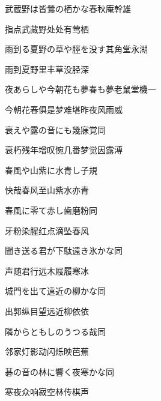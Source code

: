 \begin{haiku}
    {\FH 武蔵野は皆鶯の栖かな}\hfill{\FH 春秋庵幹雄}

    {\FK 指点武藏野处处有莺栖}
\end{haiku}

\begin{haiku}
    {\FH 雨到る夏野の草や脛を没す}\hfill{\FH 其角堂永湖}

    {\FK 雨到夏野里丰草没胫深}
\end{haiku}

\begin{haiku}
    {\FH 夜あらしや今朝花も夢春も夢}\hfill{\FH 老鼠堂機一}

    {\FK 今朝花春俱是梦难堪昨夜风雨威}
\end{haiku}

\begin{haiku}
    {\FH 衰えや露の音にも幾寐覚}\hfill{\FH 同}

    {\FK 衰朽残年增叹惋几番梦觉因露溥}
\end{haiku}

\begin{haiku}
    {\FH 春風や山紫に水青し}\hfill{\FH 子規}

    {\FK 快哉春风至山紫水亦青}
\end{haiku}

\begin{haiku}
    {\FH 春風に零て赤し歯磨粉}\hfill{\FH 同}

    {\FK 牙粉染腥红点滴坠春风}
\end{haiku}

\begin{haiku}
    {\FH 聞き送る君が下駄遠き氷かな}\hfill{\FH 同}

    {\FK 声随君行远木屐履寒冰}
\end{haiku}

\begin{haiku}
    {\FH 城門を出て遠近の柳かな}\hfill{\FH 同}

    {\FK 出郭纵目望远近柳依依}
\end{haiku}

\begin{haiku}
    {\FH 隣からともしのうつる哉}\hfill{\FH 同}

    {\FK 邻家灯影动闪烁映芭蕉}
\end{haiku}

\begin{haiku}
    {\FH 碁の音の林に響く夜寒かな}\hfill{\FH 同}

    {\FK 寒夜众响寂空林传棋声}
\end{haiku}

